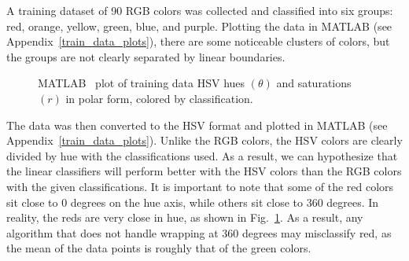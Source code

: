 \documentclass[twoside]{IEEEtran}
\begin{document}
A training dataset of 90 RGB colors was collected and classified into six groups: red, orange,
yellow, green, blue, and purple. Plotting the data in MATLAB (see Appendix~\ref{train_data_plots}), there are
some noticeable clusters of colors, but the groups are not clearly separated by linear boundaries.

\begin{figure}[!t]
    \centering
    \hfil
    \caption{MATLAB~\cite{matlab} plot of training data HSV hues \( \left(\theta\right) \) and saturations \( \left(r\right) \) in polar form, colored by classification.}%
    \label{hsv_polar}
\end{figure}

The data was then converted to the HSV format and plotted in MATLAB (see Appendix~\ref{train_data_plots}).
Unlike the RGB colors, the HSV colors are clearly divided by hue with the classifications
used. As a result, we can hypothesize that the linear classifiers will perform better with the HSV
colors than the RGB colors with the given classifications. It is important to note that some of the
red colors sit close to 0 degrees on the hue axis, while others sit close to 360 degrees. In reality,
the reds are very close in hue, as shown in Fig.~\ref{hsv_polar}. As a result, any algorithm that does not
handle wrapping at 360 degrees may misclassify red, as the mean of the data points is roughly
that of the green colors.
\end{document}
